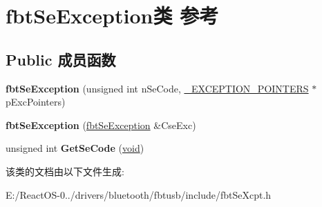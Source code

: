 \hypertarget{classfbt_se_exception}{}\section{fbt\+Se\+Exception类 参考}
\label{classfbt_se_exception}
\subsection*{Public 成员函数}
\begin{DoxyCompactItemize}
\item 
\mbox{\label{classfbt_se_exception_a36eb6d705c70c656a6241921705ffb52}} 
{\bfseries fbt\+Se\+Exception} (unsigned int n\+Se\+Code, \hyperlink{struct___e_x_c_e_p_t_i_o_n___p_o_i_n_t_e_r_s}{\+\_\+\+E\+X\+C\+E\+P\+T\+I\+O\+N\+\_\+\+P\+O\+I\+N\+T\+E\+RS} $\ast$p\+Exc\+Pointers)
\item 
\mbox{\label{classfbt_se_exception_a145f6e1941f4c931bbbcfdcba5eeb498}} 
{\bfseries fbt\+Se\+Exception} (\hyperlink{classfbt_se_exception}{fbt\+Se\+Exception} \&Cse\+Exc)
\item 
\mbox{\label{classfbt_se_exception_a33860bd8733fc8df77df3b51b656ec78}} 
unsigned int {\bfseries Get\+Se\+Code} (\hyperlink{interfacevoid}{void})
\end{DoxyCompactItemize}


该类的文档由以下文件生成\+:\begin{DoxyCompactItemize}
\item 
E\+:/\+React\+O\+S-\/0../drivers/bluetooth/fbtusb/include/fbt\+Se\+Xcpt.\+h\end{DoxyCompactItemize}
